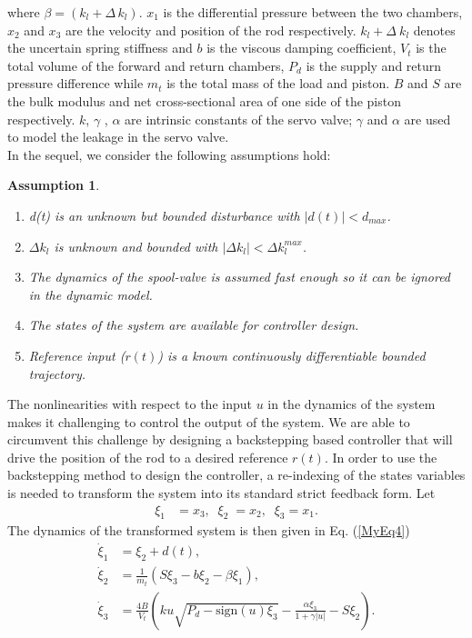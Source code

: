 \documentclass{article} %
\newtheorem{assumption}{Assumption}
\begin{document}
where $\beta=(k_l+\Delta\,k_l)$. $x_1$ is the differential pressure between the two chambers, $x_2$ and $x_3$ are the velocity and position of the rod respectively. $k_l+\Delta\ k_l$ denotes the uncertain spring stiffness and $b$ is the viscous damping coefficient, $V_t$ is the total volume of the forward and return chambers, $P_d$ is the supply and return pressure difference while $m_t$ is the total mass of the load and piston. $B$ and $S$ are the bulk modulus and net cross-sectional area of one side of the piston respectively. $k$, $\gamma$ , $\alpha$ are intrinsic constants of the servo valve; $\gamma$ and $\alpha$ are used to model the leakage in the servo valve.\\
 In the sequel, we consider the following assumptions hold:
\begin{assumption}
\begin{enumerate}
\item d(t) is an unknown but bounded disturbance with $|d(t)|<d_{max}$.
\item $\Delta k_l$ is unknown and bounded with $|\Delta k_l|< \Delta k_l^{max}$.
\item The dynamics of the spool-valve is assumed fast enough so it can be ignored in the dynamic model.
\item The states of the system are available for controller design.
\item Reference input ($r(t)$) is a known continuously differentiable bounded trajectory.
\end{enumerate}
\end{assumption}
The nonlinearities with respect to the input $u$ in the dynamics of the system makes it challenging to control the output of the system. We are able to circumvent this challenge by designing a backstepping based controller that will drive the position of the rod to a desired reference $r(t)$. In order to use the backstepping method to design the controller, a re-indexing of the states variables is needed to transform the system into its standard strict feedback form.
Let\\
\begin{equation} \label{MyEq2}
  \begin{split}
  \xi_1 &= x_3, \;\;
  \xi_2 \; = x_2, \;\;
  \xi_3 = x_1.
  \end{split}
\end{equation}
 The dynamics of the transformed system is then given in Eq. (\ref{MyEq4})
 \begin{equation} \label{MyEq4}
  \begin{split}
  {\dot \xi}_1 &= \xi_2+d(t),\\
  {\dot \xi}_2 &= \tfrac{1}{m_t}(S \xi_3-b\xi_2-\beta \xi_1),\\
  {\dot \xi}_3 &= \tfrac{4B}{V_t}(ku\sqrt{P_d-\text{sign}(u)\xi_3}-\tfrac{\alpha \xi_3}{1+\gamma \lvert u\rvert}-S\xi_2 ).
  \end{split}
\end{equation}
\end{document}
